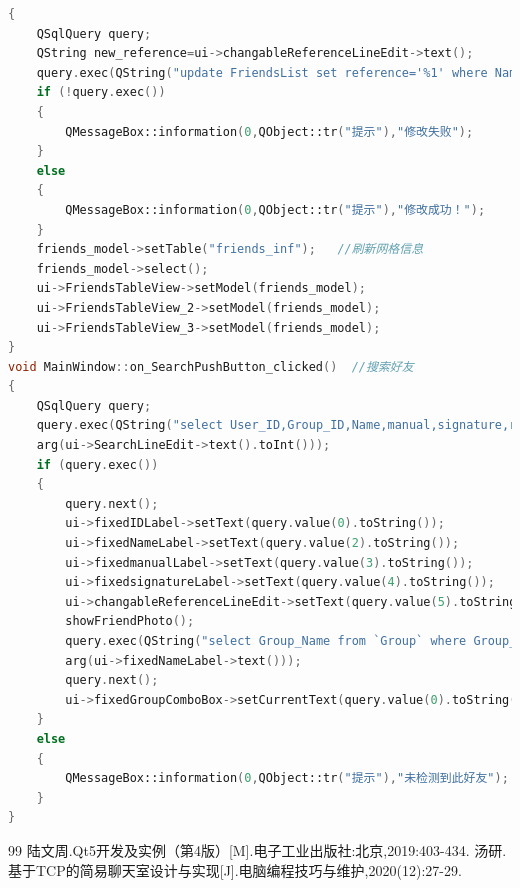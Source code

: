 \documentclass{progartcn}
\begin{document}
\begin{lstlisting}[language=c++]
{
	QSqlQuery query;
	QString new_reference=ui->changableReferenceLineEdit->text();
	query.exec(QString("update FriendsList set reference='%1' where Name='%2'").arg(new_reference).arg(ui->fixedNameLabel->text()));
	if (!query.exec())
	{
		QMessageBox::information(0,QObject::tr("提示"),"修改失败");
	}
	else
	{
		QMessageBox::information(0,QObject::tr("提示"),"修改成功！");
	}
	friends_model->setTable("friends_inf");   //刷新网格信息
	friends_model->select();
	ui->FriendsTableView->setModel(friends_model);
	ui->FriendsTableView_2->setModel(friends_model);
	ui->FriendsTableView_3->setModel(friends_model);
}
void MainWindow::on_SearchPushButton_clicked()  //搜索好友
{
	QSqlQuery query;
	query.exec(QString("select User_ID,Group_ID,Name,manual,signature,reference,Picture from FriendsList where User_ID='%1'").\
	arg(ui->SearchLineEdit->text().toInt()));
	if (query.exec())
	{
		query.next();
		ui->fixedIDLabel->setText(query.value(0).toString());
		ui->fixedNameLabel->setText(query.value(2).toString());
		ui->fixedmanualLabel->setText(query.value(3).toString());
		ui->fixedsignatureLabel->setText(query.value(4).toString());
		ui->changableReferenceLineEdit->setText(query.value(5).toString());
		showFriendPhoto();
		query.exec(QString("select Group_Name from `Group` where Group_ID=(select Group_ID from FriendsList where Name='%1')").\
		arg(ui->fixedNameLabel->text()));
		query.next();
		ui->fixedGroupComboBox->setCurrentText(query.value(0).toString());
	}
	else
	{
		QMessageBox::information(0,QObject::tr("提示"),"未检测到此好友");
	}
}
\end{lstlisting}

\begin{thebibliography}{99}
	陆文周.Qt5开发及实例（第4版）[M].电子工业出版社:北京,2019:403-434.
	汤研.基于TCP的简易聊天室设计与实现[J].电脑编程技巧与维护,2020(12):27-29.
\end{thebibliography}
\end{document}
